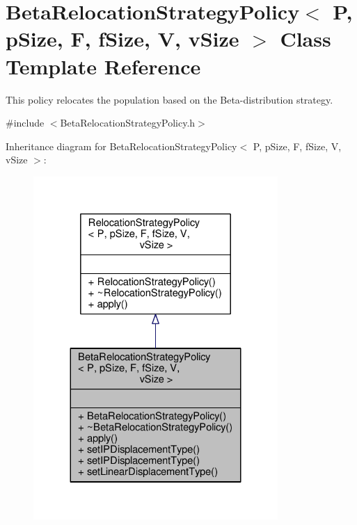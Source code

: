 \hypertarget{classBetaRelocationStrategyPolicy}{}\section{Beta\+Relocation\+Strategy\+Policy$<$ P, p\+Size, F, f\+Size, V, v\+Size $>$ Class Template Reference}
\label{classBetaRelocationStrategyPolicy}


This policy relocates the population based on the Beta-\/distribution strategy.  




{\ttfamily \#include $<$Beta\+Relocation\+Strategy\+Policy.\+h$>$}



Inheritance diagram for Beta\+Relocation\+Strategy\+Policy$<$ P, p\+Size, F, f\+Size, V, v\+Size $>$\+:
\nopagebreak
\begin{figure}[H]
\begin{center}
\leavevmode
\includegraphics[width=263pt]{classBetaRelocationStrategyPolicy__inherit__graph}
\end{center}
\end{figure}


